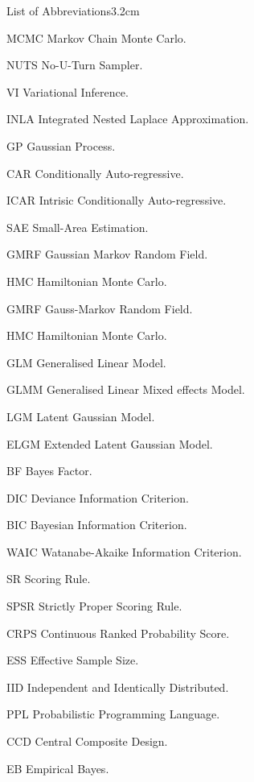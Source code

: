 \begin{mclistof}{List of Abbreviations}{3.2cm}
\item[MCMC] Markov Chain Monte Carlo.
\item[NUTS] No-U-Turn Sampler.
\item[VI] Variational Inference.
\item[INLA] Integrated Nested Laplace Approximation.
\item[GP] Gaussian Process.
\item[CAR] Conditionally Auto-regressive.
\item[ICAR] Intrisic Conditionally Auto-regressive.
\item[SAE] Small-Area Estimation.
\item[GMRF] Gaussian Markov Random Field.
\item[HMC] Hamiltonian Monte Carlo.
\item[GMRF] Gauss-Markov Random Field.
\item[HMC] Hamiltonian Monte Carlo.
\item[GLM] Generalised Linear Model.
\item[GLMM] Generalised Linear Mixed effects Model.
\item[LGM] Latent Gaussian Model.
\item[ELGM] Extended Latent Gaussian Model.
\item[BF] Bayes Factor.
\item[DIC] Deviance Information Criterion.
\item[BIC] Bayesian Information Criterion.
\item[WAIC] Watanabe-Akaike Information Criterion.
\item[SR] Scoring Rule.
\item[SPSR] Strictly Proper Scoring Rule.
\item[CRPS] Continuous Ranked Probability Score.
\item[ESS] Effective Sample Size.
\item[IID] Independent and Identically Distributed.
\item[PPL] Probabilistic Programming Language.
\item[CCD] Central Composite Design.
\item[EB] Empirical Bayes.

\end{mclistof} 
